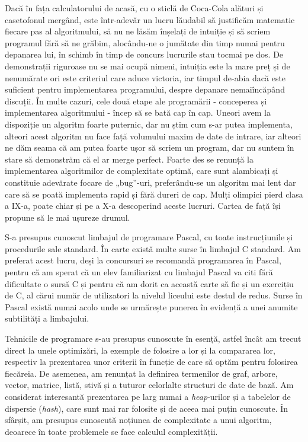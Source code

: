 Dacă în fața calculatorului de acasă, cu o sticlă de Coca-Cola alături și
casetofonul mergând, este într-adevăr un lucru lăudabil să justificăm
matematic fiecare pas al algoritmului, să nu ne lăsăm înșelați de intuiție și
să scriem programul fără să ne grăbim, alocându-ne o jumătate din timp numai
pentru depanarea lui, în schimb în timp de concurs lucrurile stau tocmai pe
dos. De demonstrații riguroase nu se mai ocupă nimeni, intuiția este la mare
preț și de nenumărate ori este criteriul care aduce victoria, iar timpul
de-abia dacă este suficient pentru implementarea programului, despre depanare
nemaiîncăpând discuții. În multe cazuri, cele două etape ale programării -
conceperea și implementarea algoritmului - încep să se bată cap în cap. Uneori
avem la dispoziție un algoritm foarte puternic, dar nu știm cum s-ar putea
implementa, alteori acest algoritm nu face față volumului maxim de date de
intrare, iar alteori ne dăm seama că am putea foarte ușor să scriem un
program, dar nu suntem în stare să demonstrăm că el ar merge perfect. Foarte
des se renunță la implementarea algoritmilor de complexitate optimă, care sunt
alambicați și constituie adevărate focare de „bug”-uri, preferându-se un
algoritm mai lent dar care să se poată implementa rapid și fără dureri de
cap. Mulți olimpici pierd clasa a IX-a, poate chiar și pe a X-a descoperind
aceste lucruri. Cartea de față își propune să le mai ușureze drumul.

S-a presupus cunoscut limbajul de programare Pascal, cu toate instrucțiunile
și procedurile sale standard. În carte există multe surse în limbajul C
standard. Am preferat acest lucru, deși la concursuri se recomandă programarea
în Pascal, pentru că am sperat că un elev familiarizat cu limbajul Pascal va
citi fără dificultate o sursă C și pentru că am dorit ca această carte să fie
și un exercițiu de C, al cărui număr de utilizatori la nivelul liceului este
destul de redus. Surse în Pascal există numai acolo unde se urmărește punerea
în evidență a unei anumite subtilități a limbajului.

Tehnicile de programare s-au presupus cunoscute în esență, astfel încât am
trecut direct la unele optimizări, la exemple de folosire a lor și la
compararea lor, respectiv la prezentarea unor criterii în funcție de care să
optăm pentru folosirea fiecăreia. De asemenea, am renunțat la definirea
termenilor de graf, arbore, vector, matrice, listă, stivă și a tuturor
celorlalte structuri de date de bază. Am considerat interesantă prezentarea pe
larg numai a {\it heap}-urilor și a tabelelor de dispersie ({\it hash}), care
sunt mai rar folosite și de aceea mai puțin cunoscute. În sfârșit, am presupus
cunoscută noțiunea de complexitate a unui algoritm, deoarece în toate
problemele se face calculul complexității.

